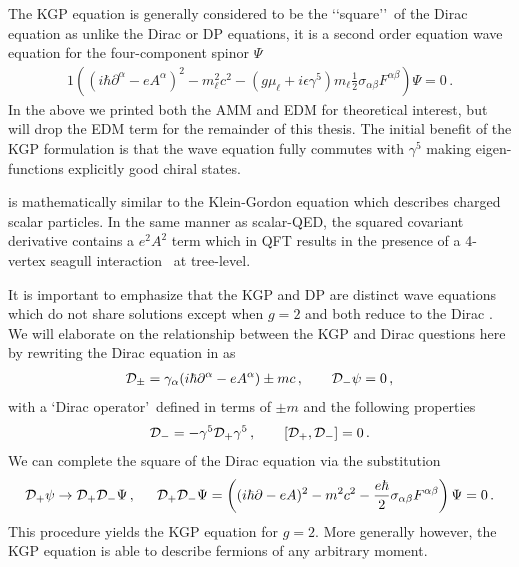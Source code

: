 The KGP equation is generally considered to be the \lq\lq square\rq\rq\ of the Dirac equation as unlike the Dirac or DP equations, it is a second order equation wave equation for the four-component spinor $\Psi$
\begin{alignat}{1}
	\label{kgp:1} \left((i\hbar\partial^{\alpha}-eA^{\alpha})^{2}-m_{\ell}^{2}c^{2}-\left(g\mu_{\ell}+i\epsilon\gamma^{5}\right)m_{\ell}\frac{1}{2}\sigma_{\alpha\beta}F^{\alpha\beta}\right)\Psi=0\,.
\end{alignat}
In the above we printed both the AMM and EDM for theoretical interest, but will drop the EDM term for the remainder of this thesis. The initial benefit of the KGP formulation is that the wave equation fully commutes with $\gamma^{5}$ making eigen-functions explicitly good chiral states.

 is mathematically similar to the Klein-Gordon equation which describes charged scalar particles. In the same manner as scalar-QED, the squared covariant derivative contains a $e^{2}A^{2}$ term which in QFT results in the presence of a 4-vertex seagull interaction~\citep{Schwartz:2014sze} at tree-level.

It is important to emphasize that the KGP  and DP  are distinct wave equations which do not share solutions except when $g=2$ and both reduce to the Dirac . We will elaborate on the relationship between the KGP and Dirac questions here by rewriting the Dirac equation in  as
\begin{alignat}{1}
	\label{do:1} \mathcal{D}_{\pm}=\gamma_{\alpha}(i\hbar\partial^{\alpha}-eA^{\alpha})\pm mc\,,\qquad
    {\cal D}_{-}\psi=0\,,
\end{alignat}
with a \lq Dirac operator\rq\ defined in terms of $\pm m$ and the following properties
\begin{align}
    \label{do:2}
    \mathcal{D}_{-}=-\gamma^{5}\mathcal{D}_{+}\gamma^{5}\,,\qquad
    [{\cal D}_{+},{\cal D}_{-}]=0\,.
\end{align}
We can complete the square of the Dirac equation via the substitution
\begin{alignat}{1}
	\label{eq:kgp:03} \mathcal{D}_{+}\psi\rightarrow\mathcal{D}_{+}\mathcal{D}_{-}\Psi\,,\indent\mathcal{D}_{+}\mathcal{D}_{-}\Psi=\left((i\hbar\partial-eA)^{2}-m^{2}c^{2}-\frac{e\hbar}{2}\sigma_{\alpha\beta}F^{\alpha\beta}\right)\Psi=0\,.
\end{alignat}
This procedure yields the KGP equation for $g=2$. More generally however, the KGP equation is able to describe fermions of any arbitrary moment.

